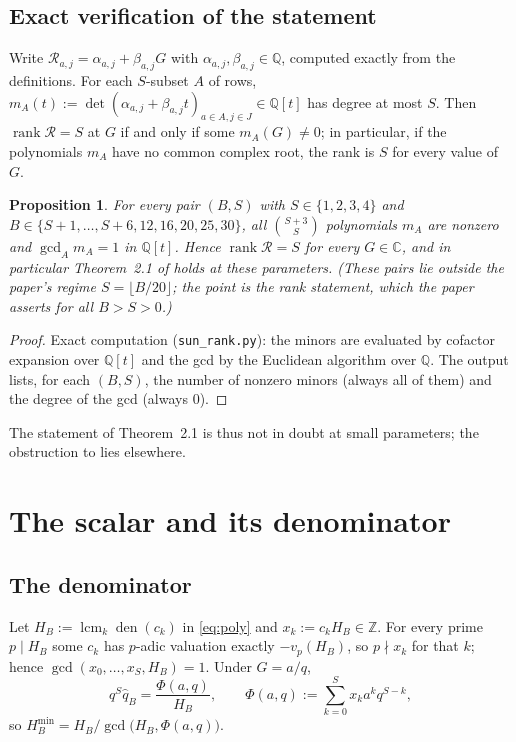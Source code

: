 \documentclass[11pt]{amsart}
\newtheorem{proposition}[theorem]{Proposition}
\theoremstyle{definition}
\newcommand{\Z}{\mathbb{Z}}
\newcommand{\Q}{\mathbb{Q}}
\newcommand{\qhat}{\widehat{q}}
\DeclareMathOperator{\rank}{rank}
\DeclareMathOperator{\lcm}{lcm}
\DeclareMathOperator{\den}{den}
\begin{document}
\subsection{Exact verification of the statement}
Write $\mathcal R_{a,j}=\alpha_{a,j}+\beta_{a,j}G$ with $\alpha_{a,j},\beta_{a,j}\in\Q$, computed exactly from
the definitions. For each $S$-subset $A$ of rows, $m_A(t):=\det(\alpha_{a,j}+\beta_{a,j}t)_{a\in A,j\in J}\in\Q[t]$
has degree at most $S$. Then $\rank\mathcal R=S$ at $G$ if and only if some $m_A(G)\ne0$; in particular, if the
polynomials $m_A$ have no common complex root, the rank is $S$ for every value of $G$.

\begin{proposition}\label{prop:rank}
For every pair $(B,S)$ with $S\in\{1,2,3,4\}$ and $B\in\{S{+}1,\dots,S{+}6,12,16,20,25,30\}$, all
$\binom{S+3}{S}$ polynomials $m_A$ are nonzero and $\gcd_A m_A=1$ in $\Q[t]$. Hence $\rank\mathcal R=S$ for
every $G\in\mathbb C$, and in particular Theorem~2.1 of \cite{Sun26} holds at these parameters. (These pairs lie
outside the paper's regime $S=\lfloor B/20\rfloor$; the point is the rank statement, which the paper asserts for
all $B>S>0$.)
\end{proposition}

\begin{proof}
Exact computation (\texttt{sun\_rank.py}): the minors are evaluated by cofactor expansion over $\Q[t]$ and the
gcd by the Euclidean algorithm over $\Q$. The output lists, for each $(B,S)$, the number of nonzero minors
(always all of them) and the degree of the gcd (always $0$).
\end{proof}

The statement of Theorem~2.1 is thus not in doubt at small parameters; the obstruction to \cite{Sun26} lies
elsewhere.

\section{The scalar and its denominator}

\subsection{The denominator}
Let $H_B:=\lcm_k\den(c_k)$ in \eqref{eq:poly} and $x_k:=c_kH_B\in\Z$. For every prime $p\mid H_B$ some $c_k$
has $p$-adic valuation exactly $-v_p(H_B)$, so $p\nmid x_k$ for that $k$; hence $\gcd(x_0,\dots,x_S,H_B)=1$.
Under $G=a/q$,
\[
q^S\qhat_B=\frac{\Phi(a,q)}{H_B},\qquad\Phi(a,q):=\sum_{k=0}^Sx_ka^kq^{S-k},
\]
so $H_B^{\min}=H_B/\gcd\bigl(H_B,\Phi(a,q)\bigr)$.
\end{document}
